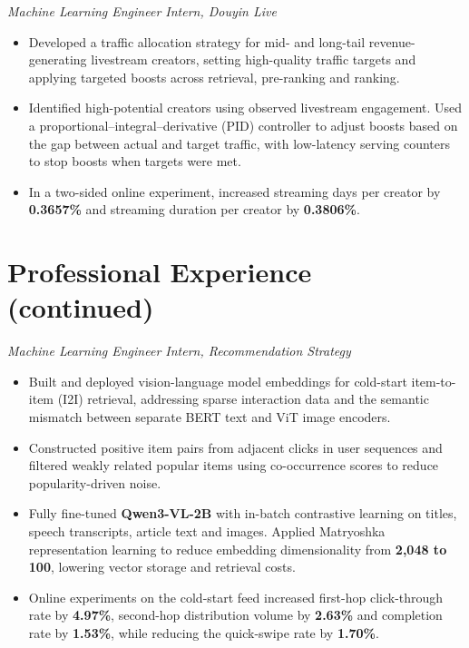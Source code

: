 \documentclass{resume}
\begin{document}
\vspace{0.4em}
\textit{Machine Learning Engineer Intern, Douyin Live}
\begin{itemize}
  \item Developed a traffic allocation strategy for mid- and long-tail revenue-generating livestream creators, setting high-quality traffic targets and applying targeted boosts across retrieval, pre-ranking and ranking.
  \item Identified high-potential creators using observed livestream engagement. Used a proportional--integral--derivative (PID) controller to adjust boosts based on the gap between actual and target traffic, with low-latency serving counters to stop boosts when targets were met.
  \item In a two-sided online experiment, increased streaming days per creator by \textbf{0.3657\%} and streaming duration per creator by \textbf{0.3806\%}.
\end{itemize}

\newpage
\section{Professional Experience (continued)}
\textit{Machine Learning Engineer Intern, Recommendation Strategy}
\begin{itemize}
  \item Built and deployed vision-language model embeddings for cold-start item-to-item (I2I) retrieval, addressing sparse interaction data and the semantic mismatch between separate BERT text and ViT image encoders.
  \item Constructed positive item pairs from adjacent clicks in user sequences and filtered weakly related popular items using co-occurrence scores to reduce popularity-driven noise.
  \item Fully fine-tuned \textbf{Qwen3-VL-2B} with in-batch contrastive learning on titles, speech transcripts, article text and images. Applied Matryoshka representation learning to reduce embedding dimensionality from \textbf{2,048 to 100}, lowering vector storage and retrieval costs.
  \item Online experiments on the cold-start feed increased first-hop click-through rate by \textbf{4.97\%}, second-hop distribution volume by \textbf{2.63\%} and completion rate by \textbf{1.53\%}, while reducing the quick-swipe rate by \textbf{1.70\%}.
\end{itemize}
\end{document}
